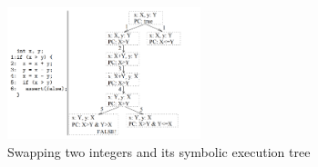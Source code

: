 \documentclass[11pt]{IEEEtran}
\begin{document}
\begin{figure}
		\centering
        \includegraphics[width=0.5\textwidth]{symbolicsimple}
        \caption{Swapping two integers and its symbolic execution tree}
        \label{fig:symbolicsimple}
      \end{figure}
\end{document}
